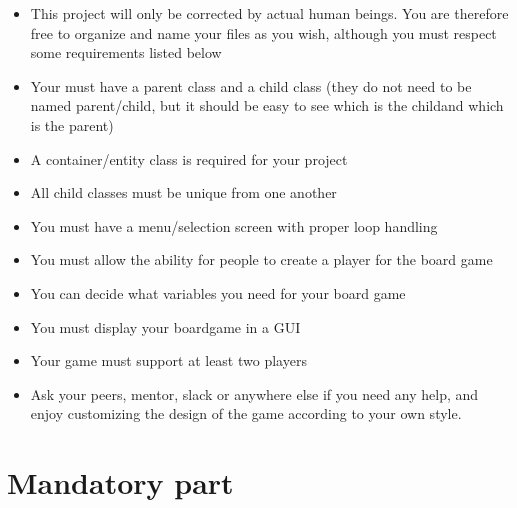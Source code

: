 \documentclass{42-en}
\begin{document}
	    \begin{itemize}
		\item This project will only be corrected by actual human beings.
		You are therefore free to organize and name your files as you wish,
		although you must respect some requirements listed below
		\item Your must have a parent class and a child class (they do not
		need to be named parent/child, but it should be easy to see
		which is the childand which is the parent)
		\item A container/entity class is required for your project
		

		\item All child classes must be unique from one another
		\item You must have a menu/selection screen with proper loop handling
		\item You must allow the ability for people to create a player for the board game
		\item You can decide what variables you need for your board game
		\item You must display your boardgame in a GUI
		\item Your game must support at least two players
		\item Ask your peers, mentor, slack or anywhere else if you need
		any help, and enjoy customizing the design of the game according to your own style.\\
	\end{itemize}


\chapter{Mandatory part}

\end{document}
